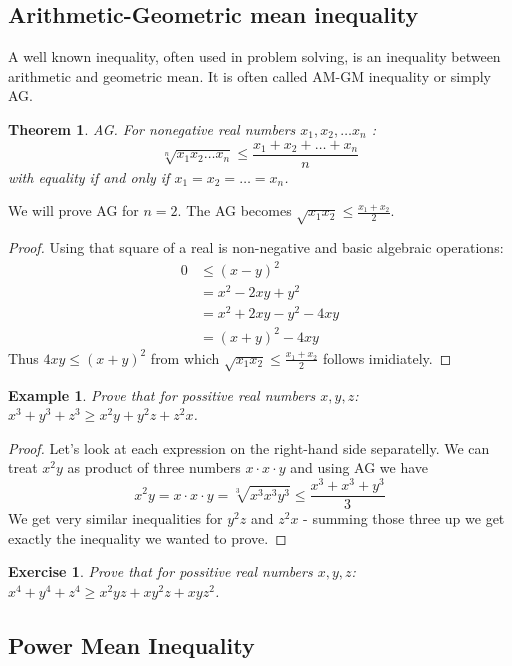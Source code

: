\documentclass[11pt,a5paper]{article}
\newtheorem{theorem}{Example}
\newtheorem{exercise}{Exercise}
\newtheorem*{Theorem}{Theorem}
\begin{document}
\subsection*{Arithmetic-Geometric mean inequality}

A well known inequality, often used in problem solving, is an 
inequality between arithmetic and geometric mean. It is often 
called AM-GM inequality or simply AG.

\begin{Theorem} \emph{AG.}
For nonegative real numbers $x_1, x_2, \dots x_n$ : 
\[\sqrt[n]{x_1x_2\dots x_n} \le  \frac{x_1 + x_2 + \dots + x_n}{n}\] 
with equality if and only if $x_1 = x_2 = \dots = x_n$. \\
\end{Theorem}

\noindent We will prove AG for $n=2$. The AG becomes 
$\sqrt{x_1x_2} \le  \frac{x_1 + x_2}{2}$. 
\begin{proof} Using that square of a real is non-negative and basic 
algebraic operations:
	\begin{align*}
	0 & \le (x-y)^2 \\
	 & = x^2 - 2xy + y^2 \\
	 & = x^2 + 2xy - y^2 -4xy \\
	 & = (x+y)^2 - 4xy 
	\end{align*}
	Thus $4xy \le (x+y)^2$ from which 
	$\sqrt{x_1x_2} \le  \frac{x_1 + x_2}{2}$ follows imidiately. 
\end{proof}

\begin{theorem}
	Prove that for possitive real numbers $x, y, z$: 
	$x^3 + y^3 + z^3 \ge x^2y + y^2z + z^2x$.
\end{theorem}

\begin{proof} Let's look at each expression on the right-hand side 
separatelly. We can treat $x^2y$ as product of three numbers 
$x\cdot x\cdot y$ and using AG we have 
\[x^2y = x\cdot x\cdot y = \sqrt[3]{x^3x^3y^3} \le\frac{x^3 + x^3 + y^3}{3}\]
We get very similar inequalities for $y^2z$ and $z^2x$ - summing 
those three up we get exactly the inequality we wanted to prove.
\end{proof}

\begin{exercise} Prove that for possitive real numbers $x, y, z$: 
$x^4 + y^4 + z^4 \ge x^2yz + xy^2z + xyz^2$.
\end{exercise}

\subsection*{Power Mean Inequality}
\end{document}
